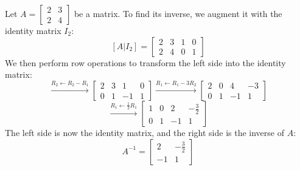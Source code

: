 \begin{eg}
    Let $A = \begin{bmatrix}
        2 & 3 \\
        2 & 4
    \end{bmatrix}$ be a matrix. To find its inverse, we augment it with the identity matrix $I_2$:
    \[
        [A | I_2] = \left[\begin{array}{cc|cc}
            2 & 3 & 1 & 0 \\
            2 & 4 & 0 & 1
        \end{array}\right]
    \]
    We then perform row operations to transform the left side into the identity matrix:
    \[
        \xrightarrow{R_2 \leftarrow R_2 - R_1}
        \left[\begin{array}{cc|cc}
            2 & 3 & 1 & 0 \\
            0 & 1 & -1 & 1
        \end{array}\right]
        \xrightarrow{R_1 \leftarrow R_1 - 3R_2}
        \left[\begin{array}{cc|cc}
            2 & 0 & 4 & -3 \\
            0 & 1 & -1 & 1
        \end{array}\right]
    \]
    \[
        \xrightarrow{R_1 \leftarrow \frac{1}{2} R_1}
        \left[\begin{array}{cc|cc}
            1 & 0 & 2 & -\frac{3}{2} \\
            0 & 1 & -1 & 1
        \end{array}\right]
    \]
    The left side is now the identity matrix, and the right side is the inverse of $A$:
    \[
        A^{-1} = \begin{bmatrix}
            2 & -\frac{3}{2} \\
            -1 & 1
        \end{bmatrix}
    \]
\end{eg}